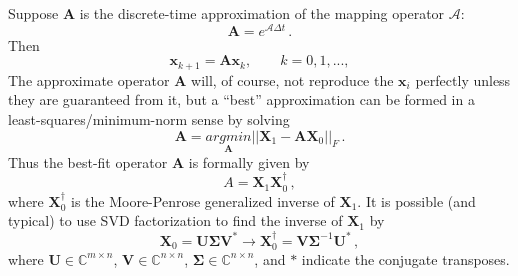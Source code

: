 Suppose $\mathbf{A}$ is the discrete-time approximation of the mapping operator $\mathcal{A}$:
\begin{equation}
\label{eq:A}
\mathbf{A} = e^{\mathcal{A} \Delta t} \, .
\end{equation}
Then 
\begin{equation}
\label{eq:x0x1}
\mathbf{x}_{k+1} = \mathbf{A} \mathbf{x}_{k}, \quad \quad k = 0,1,...,
\end{equation}
The approximate operator $\mathbf{A}$ will, of course, not reproduce the $\mathbf{x}_i$ perfectly unless they are guaranteed from it, but a ``best'' approximation can be formed in a least-squares/minimum-norm sense by solving
\begin{equation}
\label{eq:least}
\mathbf{A} =  \underset{\mathbf{A}}{argmin} ||\mathbf{X}_1 - \mathbf{A} \mathbf{X}_0||_F \, .
\end{equation}
Thus the best-fit operator $\mathbf{A}$ is formally given by 
\begin{equation}
\label{eq:fullA}
A = \mathbf{X}_1 \mathbf{X}_0^{\dagger} \, ,
\end{equation}
where $\mathbf{X}_0^{\dagger}$ is the Moore-Penrose generalized inverse of $\mathbf{X}_1$.
It is possible (and typical) to use SVD factorization to find the inverse of $\mathbf{X}_1$ by
\begin{equation}
\label{eq:svd}
\mathbf{X}_0 = \mathbf{U} \bm{\Sigma} \mathbf{V}^{*} \rightarrow \mathbf{X}_0^{\dagger} = \mathbf{V} \bm{\Sigma}^{-1} \mathbf{U}^* \, ,
\end{equation}
where $\mathbf{U} \in \mathbb{C}^{m\times n}$, $\mathbf{V} \in \mathbb{C}^{n\times n}$, $\bm{\Sigma} \in \mathbb{C}^{n\times n}$, and $*$ indicate the conjugate transposes. 

